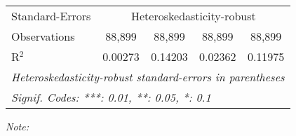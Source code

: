 \begin{table}[htbp!]
\begin{adjustbox}{width = 1\textwidth, max height = 0.95\textheight, center}
\begin{threeparttable}[b]
\begin{tabular}{lcccc}
            \midrule 
            Standard-Errors & \multicolumn{4}{c}{Heteroskedasticity-robust} \\ 
            Observations         & 88,899                          & 88,899                         & 88,899                         & 88,899\\  
            R$^2$                & 0.00273                         & 0.14203                        & 0.02362                        & 0.11975\\  
            \midrule \midrule
            \multicolumn{5}{l}{\emph{Heteroskedasticity-robust standard-errors in parentheses}}\\
            \multicolumn{5}{l}{\emph{Signif. Codes: ***: 0.01, **: 0.05, *: 0.1}}\\
         \end{tabular}
         
         \begin{tablenotes}\item \medskip \textit{Note:}
         \end{tablenotes}
      \end{threeparttable}
   \end{adjustbox}
\end{table}



